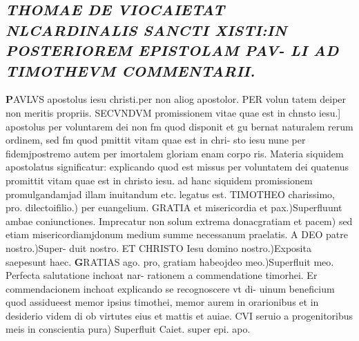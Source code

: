 \documentclass{article}
\begin{document}
\begin{pages}
{}
\subsection*{\textit{THOMAE DE VIOCAIETAT NLCARDINALIS SANCTI XISTI:IN POSTERIOREM EPISTOLAM PAV- LI AD TIMOTHEVM COMMENTARII. }}\pstart \huge\textbf{P}\normalsize AVLVS apostolus iesu christi.per non aliog apostolor. PER volun tatem deiper non meritis propriis. SECVNDVM promissionem vitae quae est in chnsto iesu.] apostolus per voluntarem dei non fm quod disponit et gu bernat naturalem rerum ordinem, sed fm quod pmittit vitam quae est in chri- sto iesu nune per fidemjpostremo autem per imortalem gloriam enam corpo ris. Materia siquidem apostolatus significatur: explicando quod est missus per voluntatem dei quatenus promittit vitam quae est in christo iesu. ad hanc siquidem promissionem promulgandamjad illam inuitandum etc. legatus est. TIMOTHEO charissimo, pro. dilectoifilio.) per euangelium. GRATIA et misericordia et pax.)Superfluunt ambae coniunctiones. Imprecatur non solum extrema donacgratiam et pacem) sed etiam misericordiamjdonum medium summe necessanum praelatis. A DEO patre nostro.)Super- duit nostro. ET CHRISTO Iesu domino nostro.)Exposita saepesunt haec.  \pend\pstart \huge\textbf{G}\normalsize RATIAS ago. pro, gratiam habeojdeo meo.)Superfluit meo. Perfecta salutatione inchoat nar- rationem a commendatione timorhei. Er commendacionem inchoat explicando se recognoscere vt di- uinum beneficium quod assidueest memor ipsius timothei, memor aurem in orarionibus et in desiderio videm di ob virtutes eius et mattis et auiae. CVI seruio a progenitoribus meis in conscientia pura) Superfluit Caiet. super epi. apo.  \pend
\endnumbering
\end{pages}
\end{document}
